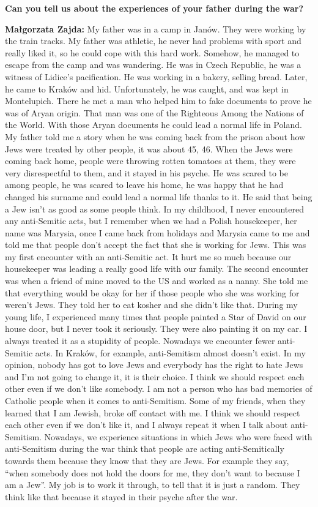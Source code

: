 \textbf{Can you tell us about the experiences of your father during the war?} 

\textbf{Małgorzata Zajda:} My father was in a camp in Janów. They were working by the train tracks. My father was athletic, he never had problems with sport and really liked it, so he could cope with this hard work. Somehow, he managed to escape from the camp and was wandering. He was in Czech Republic, he was a witness of Lidice's pacification. He was working in a bakery, selling bread. Later, he came to Kraków and hid. Unfortunately, he was caught, and was kept in Montelupich. There he met a man who helped him to fake documents to prove he was of Aryan origin. That man was one of the Righteous Among the Nations of the World. With those Aryan documents he could lead a normal life in Poland. \\
My father told me a story when he was coming back from the prison about how Jews were treated by other people, it was about 45, 46. When the Jews were coming back home, people were throwing rotten tomatoes at them, they were very disrespectful to them, and it stayed in his psyche. He was scared to be among people, he was scared to leave his home, he was happy that he had changed his surname and could lead a normal life thanks to it. He said that being a Jew isn't as good as some people think. In my childhood, I never encountered any anti-Semitic acts, but I remember when we had a Polish housekeeper, her name was Marysia, once I came back from holidays and Marysia came to me and told me that people don't accept the fact that she is working for Jews. This was my first encounter with an anti-Semitic act. It hurt me so much because our housekeeper was leading a really good life with our family. The second encounter was when a friend of mine moved to the US and worked as a nanny. She told me that everything would be okay for her if those people who she was working for weren't Jews. They told her to eat kosher and she didn't like that. During my young life, I experienced many times that people painted a Star of David on our house door, but I never took it seriously. They were also painting it on my car. I always treated it as a stupidity of people. Nowadays we encounter fewer anti-Semitic acts. In Kraków, for example, anti-Semitism almost doesn't exist. In my opinion, nobody has got to love Jews and everybody has the right to hate Jews and I’m not going to change it, it is their choice. I think we should respect each other even if we don't like somebody. I am not a person who has bad memories of Catholic people when it comes to anti-Semitism. Some of my friends, when they learned that I am Jewish, broke off contact with me. I think we should respect each other even if we don't like it, and I always repeat it when I talk about anti-Semitism. Nowadays, we experience situations in which Jews who were faced with anti-Semitism during the war think that people are acting anti-Semitically towards them because they know that they are Jews. For example they say, ``when somebody does not hold the doors for me, they don't want to because I am a Jew''. My job is to work it through, to tell that it is just a random. They think like that because it stayed in their psyche after the war.  


